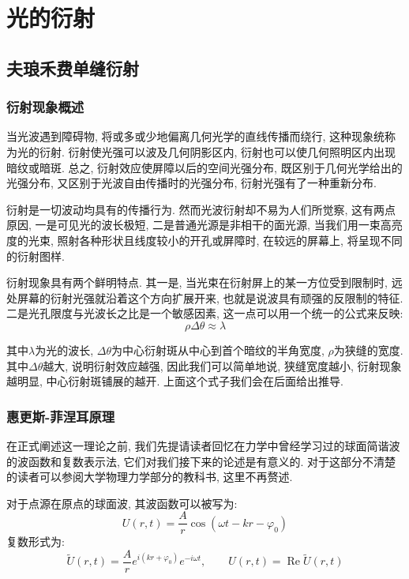 \graphicspath{{figure/chap3/}}
\chapter{光的衍射}

\section{夫琅禾费单缝衍射}

\subsection{衍射现象概述}
当光波遇到障碍物, 将或多或少地偏离几何光学的直线传播而绕行, 这种现象统称为光的衍射. 衍射使光强可以波及几何阴影区内, 衍射也可以使几何照明区内出现暗纹或暗斑. 总之, 衍射效应使屏障以后的空间光强分布, 既区别于几何光学给出的光强分布, 又区别于光波自由传播时的光强分布, 衍射光强有了一种重新分布.

衍射是一切波动均具有的传播行为. 然而光波衍射却不易为人们所觉察, 这有两点原因, 一是可见光的波长极短, 二是普通光源是非相干的面光源, 当我们用一束高亮度的光束, 照射各种形状且线度较小的开孔或屏障时, 在较远的屏幕上, 将呈现不同的衍射图样.


衍射现象具有两个鲜明特点. 其一是, 当光束在衍射屏上的某一方位受到限制时, 远处屏幕的衍射光强就沿着这个方向扩展开来, 也就是说波具有顽强的反限制的特征. 二是光孔限度与光波长之比是一个敏感因素, 这一点可以用一个统一的公式来反映:
\[
\rho \Delta \theta \approx \lambda
\]

其中$\lambda$为光的波长, $\Delta \theta$为中心衍射斑从中心到首个暗纹的半角宽度, $\rho$为狭缝的宽度. 其中$\Delta \theta$越大, 说明衍射效应越强, 因此我们可以简单地说, 狭缝宽度越小, 衍射现象越明显, 中心衍射斑铺展的越开. 上面这个式子我们会在后面给出推导.


\subsection{惠更斯-菲涅耳原理}

在正式阐述这一理论之前, 我们先提请读者回忆在力学中曾经学习过的球面简谐波的波函数和复数表示法, 它们对我们接下来的论述是有意义的. 对于这部分不清楚的读者可以参阅大学物理力学部分的教科书, 这里不再赘述.

对于点源在原点的球面波, 其波函数可以被写为:
\[
U(r,t) = \frac{A}{r}\cos(\omega t-kr-\varphi_0)
\]
复数形式为:
\[
\widetilde U(r,t) = \frac{A}{r}e^{i(kr+\varphi_0)}e^{-i\omega t},\qquad U(r,t)=\operatorname{Re}\widetilde U(r,t)
\]

